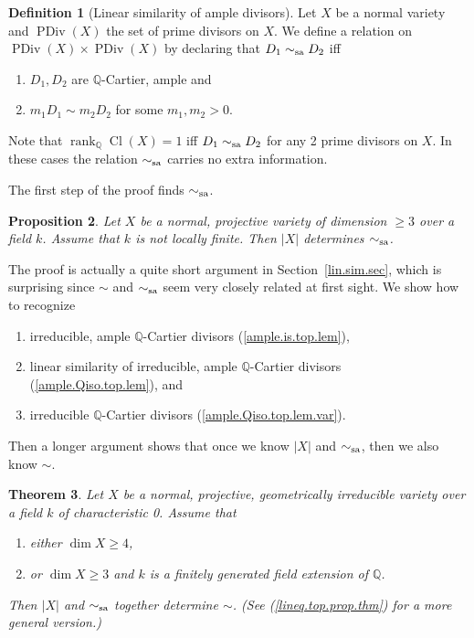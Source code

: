 \documentclass{amsart}
\newtheorem{thm}{Theorem}%
\newtheorem{prop}[thm]{Proposition}
\theoremstyle{definition}
\newtheorem{defn}[thm]{Definition}
\theoremstyle{remark}
\newcommand{\q}[0]{{\mathbb Q}}
\newcommand{\qrank}[0]{\operatorname{rank}_{\q}}
\newcommand{\cl}[0]{\operatorname{Cl}}
\newcommand{\pdiv}[0]{\operatorname{PDiv}}
\newcommand{\simsa}[0]{\sim_{\rm sa}}
\begin{document}
\begin{defn}[Linear  similarity of ample divisors]\label{simsa.defn}
 Let  $X$ be a normal variety and $\pdiv(X)$ the set of prime divisors on $X$. 
We define a relation on  $\pdiv(X)\times \pdiv(X)$ by
declaring that  $D_1\simsa D_2$ iff
\begin{enumerate}
\item $D_1, D_2$ are $\q$-Cartier, ample and
\item $m_1D_1\sim m_2D_2$ for some $m_1, m_2>0$.
\end{enumerate}
Note that  $\qrank\cl(X)=1$ iff  $D_1\simsa D_2$ for any 2 prime divisors on $X$. In these cases the relation $\simsa$ carries no extra information.
\end{defn}

The first step of the proof finds  $\simsa$.




\begin{prop}\label{main.thm.pf.step.1}   Let $X$ be a normal, projective variety of dimension $\geq 3$ over a field $k$. Assume that $k$ is not locally finite. Then $|X|$ determines $\simsa$.
\end{prop}

The proof  is actually  a quite short argument in Section~\ref{lin.sim.sec}, which is surprising since
$\sim$ and $\simsa$ seem very closely related at first sight.
We show how to recognize
\begin{enumerate}
\item irreducible, ample  $\q$-Cartier divisors (\ref{ample.is.top.lem}),
\item linear similarity of  irreducible, ample  $\q$-Cartier divisors
 (\ref{ample.Qiso.top.lem}), and
\item irreducible $\q$-Cartier divisors  (\ref{ample.Qiso.top.lem.var}).
\end{enumerate}







Then a longer argument shows that once we know $|X|$ and $\simsa$,
then we also know $\sim$.




\begin{thm}\label{main.thm.pf.step.2}
 Let $X$ be a normal, projective, geometrically irreducible variety over a field $k$ of characteristic 0. Assume that
\begin{enumerate}
\item either $\dim X\geq 4$,
\item or $\dim X\geq 3$ and $k$ is a   finitely generated  field extension of $\q$.
\end{enumerate}
Then  $|X|$ and $\simsa$ together determine $\sim$.
(See (\ref{lineq.top.prop.thm}) for a more general version.)
\end{thm}
\end{document}

